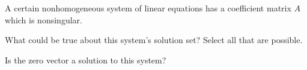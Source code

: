 \documentclass{ximera}
\begin{document}
\begin{exercise}
  A certain nonhomogeneous system of linear equations has a
  coefficient matrix $A$ which is nonsingular.
  
  What could be true about this system's solution set?  Select all that
  are possible.
  \begin{selectAll}
  \end{selectAll}
  
  Is the zero vector a solution to this system?
  \begin{multipleChoice}
  \end{multipleChoice}
\end{exercise}
\end{document}
